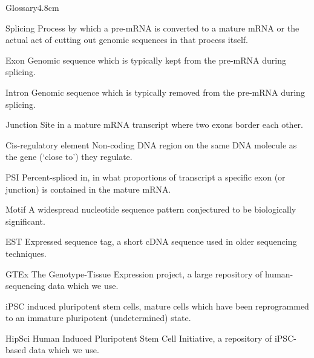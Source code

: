 \begin{mclistof}{Glossary}{4.8cm}
\item[Splicing] Process by which a pre-mRNA is converted to a mature mRNA or the actual act of cutting out genomic sequences in that process itself.
\item[Exon] Genomic sequence which is typically kept from the pre-mRNA during splicing.
\item[Intron] Genomic sequence which is typically removed from the pre-mRNA during splicing.
\item[Junction] Site in a mature mRNA transcript where two exons border each other.
\item[Cis-regulatory element] Non-coding DNA region on the same DNA molecule as the gene (`close to') they regulate.
\item[PSI] Percent-spliced in, in what proportions of transcript a specific exon (or junction) is contained in the mature mRNA.
\item[Motif] A widespread nucleotide sequence pattern conjectured to be biologically significant.
\item[EST] Expressed sequence tag, a short cDNA sequence used in older sequencing techniques.
\item[GTEx] The Genotype-Tissue Expression project, a large repository of human-sequencing data which we use.

\item[iPSC] induced pluripotent stem cells, mature cells which have been reprogrammed to an immature pluripotent (undetermined) state.
\item[HipSci] Human Induced Pluripotent Stem Cell Initiative, a repository of iPSC-based data which we use.


\end{mclistof}
